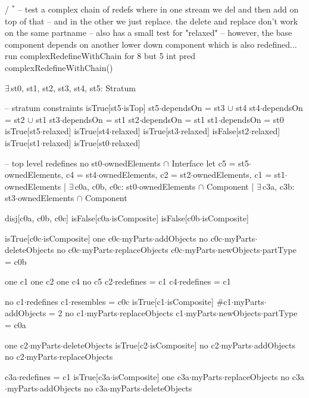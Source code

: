 / $\!\!\!^\ast\!$
-- test a complex chain of redefs where in one stream we del and then add on top of that
-- and in the other we just replace.  the delete and replace don't work on the same partname
-- also has a small test for "relaxed"
-- however, the base component depends on another lower down component which is also redefined...
run complexRedefineWithChain for 8 but 5 int
pred complexRedefineWithChain()
{
  $\exists\,$st0, st1, st2, st3, st4, st5: Stratum
  {
    -- stratum constraints
    isTrue[st5$\cdot$isTop]
    st5$\cdot$dependsOn = st3 $\cup$ st4
    st4$\cdot$dependsOn = st2 $\cup$ st1
    st3$\cdot$dependsOn = st1
    st2$\cdot$dependsOn = st1
    st1$\cdot$dependsOn = st0
    isTrue[st5$\cdot$relaxed]
    isTrue[st4$\cdot$relaxed]
    isTrue[st3$\cdot$relaxed]
    isFalse[st2$\cdot$relaxed]
    isTrue[st1$\cdot$relaxed]
    isTrue[st0$\cdot$relaxed]

    -- top level redefines
    no st0$\cdot$ownedElements $\cap$ Interface
    let
      c5 = st5$\cdot$ownedElements,
      c4 = st4$\cdot$ownedElements,
      c2 = st2$\cdot$ownedElements,
      c1 = st1$\cdot$ownedElements |
    $\exists\,$c0a, c0b, c0c: st0$\cdot$ownedElements $\cap$ Component |
    $\exists\,$c3a, c3b: st3$\cdot$ownedElements $\cap$ Component
    {
      disj[c0a, c0b, c0c]
      isFalse[c0a$\cdot$isComposite]
      isFalse[c0b$\cdot$isComposite]

      isTrue[c0c$\cdot$isComposite]
      one c0c$\cdot$myParts$\cdot$addObjects
      no c0c$\cdot$myParts$\cdot$deleteObjects
      no c0c$\cdot$myParts$\cdot$replaceObjects
      c0c$\cdot$myParts$\cdot$newObjects$\cdot$partType = c0b
      
      one c1 one c2 one c4 no c5
      c2$\cdot$redefines = c1
      c4$\cdot$redefines = c1

      no c1$\cdot$redefines
      c1$\cdot$resembles = c0c
      isTrue[c1$\cdot$isComposite]
      #c1$\cdot$myParts$\cdot$addObjects = 2
      no c1$\cdot$myParts$\cdot$replaceObjects
      c1$\cdot$myParts$\cdot$newObjects$\cdot$partType = c0a
      
      one c2$\cdot$myParts$\cdot$deleteObjects
      isTrue[c2$\cdot$isComposite]
      no c2$\cdot$myParts$\cdot$addObjects
      no c2$\cdot$myParts$\cdot$replaceObjects
      
      c3a$\cdot$redefines = c1
      isTrue[c3a$\cdot$isComposite]
      one c3a$\cdot$myParts$\cdot$replaceObjects
      no c3a$\cdot$myParts$\cdot$addObjects
      no c3a$\cdot$myParts$\cdot$deleteObjects

}}}
